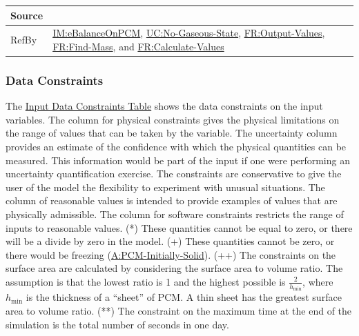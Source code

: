 \documentclass[12pt]{article}
\begin{document}
\begin{minipage}{\textwidth}
\begin{tabular}{>{\raggedright}p{}>{\raggedright\arraybackslash}p{}}
\\ \midrule
Source & \cite{koothoor2013}
         
\\ \midrule
RefBy & \hyperref[IM:eBalanceOnPCM]{IM:eBalanceOnPCM}, \hyperref[unlikeChgNGS]{UC:No-Gaseous-State}, \hyperref[outputValues]{FR:Output-Values}, \hyperref[findMass]{FR:Find-Mass}, and \hyperref[calcValues]{FR:Calculate-Values}
        
\\ \bottomrule
\end{tabular}
\end{minipage}

\subsubsection{Data Constraints}
\label{Sec:DataConstraints}
The \hyperref[Table:InDataConstraints]{Input Data Constraints Table} shows the data constraints on the input variables. The column for physical constraints gives the physical limitations on the range of values that can be taken by the variable. The uncertainty column provides an estimate of the confidence with which the physical quantities can be measured. This information would be part of the input if one were performing an uncertainty quantification exercise. The constraints are conservative to give the user of the model the flexibility to experiment with unusual situations. The column of reasonable values is intended to provide examples of values that are physically admissible. The column for software constraints restricts the range of inputs to reasonable values. (*) These quantities cannot be equal to zero, or there will be a divide by zero in the model. (+) These quantities cannot be zero, or there would be freezing (\hyperref[assumpPIS]{A:PCM-Initially-Solid}). (++) The constraints on the surface area are calculated by considering the surface area to volume ratio. The assumption is that the lowest ratio is 1 and the highest possible is $\frac{2}{{h_{\text{min}}}}$, where ${h_{\text{min}}}$ is the thickness of a ``sheet'' of PCM. A thin sheet has the greatest surface area to volume ratio. (**) The constraint on the maximum time at the end of the simulation is the total number of seconds in one day.
\end{document}
